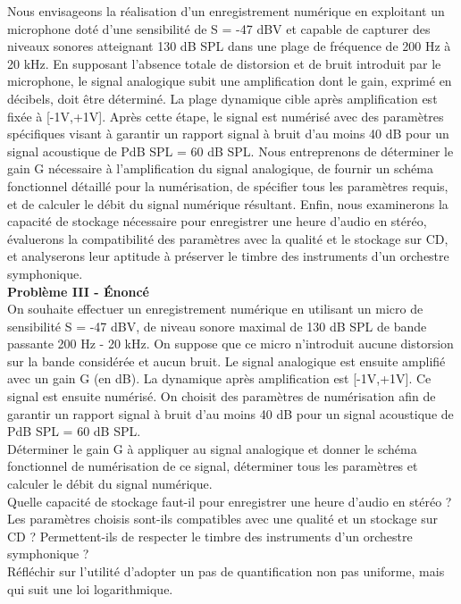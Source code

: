 Nous envisageons la réalisation d'un enregistrement numérique en exploitant un microphone doté d'une sensibilité de S = -47 dBV et capable de capturer des niveaux sonores atteignant 130 dB SPL dans une plage de fréquence de 200 Hz à 20 kHz. En supposant l'absence totale de distorsion et de bruit introduit par le microphone, le signal analogique subit une amplification dont le gain, exprimé en décibels, doit être déterminé. La plage dynamique cible après amplification est fixée à [-1V,+1V]. Après cette étape, le signal est numérisé avec des paramètres spécifiques visant à garantir un rapport signal à bruit d'au moins 40 dB pour un signal acoustique de PdB SPL = 60 dB SPL. Nous entreprenons de déterminer le gain G nécessaire à l'amplification du signal analogique, de fournir un schéma fonctionnel détaillé pour la numérisation, de spécifier tous les paramètres requis, et de calculer le débit du signal numérique résultant. Enfin, nous examinerons la capacité de stockage nécessaire pour enregistrer une heure d'audio en stéréo, évaluerons la compatibilité des paramètres avec la qualité et le stockage sur CD, et analyserons leur aptitude à préserver le timbre des instruments d'un orchestre symphonique.
\newline
\\
\textbf{Problème III - Énoncé } \  \\
On souhaite effectuer un enregistrement numérique en utilisant un micro de sensibilité S = -47 dBV, de niveau sonore maximal de 130 dB SPL de bande passante 200 Hz - 20 kHz. On suppose que ce micro n'introduit aucune distorsion sur la bande considérée et aucun bruit. Le signal analogique est ensuite amplifié avec un gain G (en dB). La dynamique après amplification est [-1V,+1V]. Ce signal est ensuite numérisé. On choisit des paramètres de numérisation afin de garantir un rapport signal à bruit d'au moins 40 dB pour un signal acoustique de PdB SPL = 60 dB SPL.
\\
Déterminer le gain G à appliquer au signal analogique et donner le schéma fonctionnel de numérisation de ce signal, déterminer tous les paramètres et calculer le débit du signal numérique. 
\\
Quelle capacité de stockage faut-il pour enregistrer une heure d'audio en stéréo ? Les paramètres choisis sont-ils compatibles avec une qualité et un stockage sur CD ? Permettent-ils de respecter le timbre des instruments d'un orchestre symphonique ?
\\
Réfléchir sur l'utilité d'adopter un pas de quantification non pas uniforme, mais qui suit une loi logarithmique.